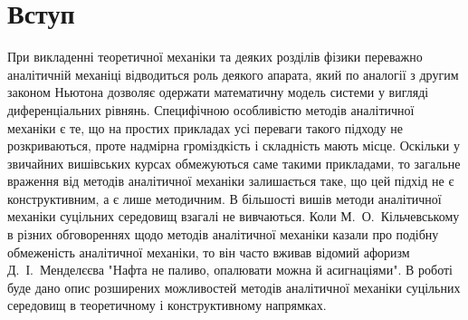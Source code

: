 \documentclass[11pt, reqno]{amsart}
\begin{document}
\section*{Вступ}
При викладенні теоретичної механіки та деяких розділів фізики переважно аналітичній механіці відводиться роль деякого апарата, який по аналогії з другим законом Ньютона дозволяє одержати математичну модель системи у вигляді диференціальних рівнянь. Специфічною особливістю методів аналітичної механіки є те, що на простих прикладах усі переваги такого підходу не розкриваються, проте надмірна громіздкість і складність мають місце. Оскільки у звичайних вишівських курсах обмежуються саме такими прикладами, то загальне враження від методів аналітичної механіки залишається таке, що цей підхід не є конструктивним, а є лише методичним. В більшості вишів методи аналітичної механіки суцільних середовищ взагалі не вивчаються. Коли М.~О.~Кільчевському в різних обговореннях щодо методів аналітичної механіки казали про подібну обмеженість аналітичної механіки, то він часто вживав відомий афоризм Д.~І.~Менделєєва "Нафта не паливо, опалювати можна й асигнаціями". В роботі буде дано опис розширених можливостей методів аналітичної механіки суцільних середовищ в теоретичному і конструктивному напрямках.
\end{document}
